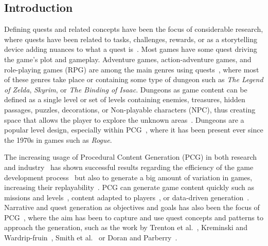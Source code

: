 \subsection{Introduction}

Defining quests and related concepts have been the focus of considerable research, where quests have been related to tasks, challenges, rewards, or as a storytelling device adding nuances to what a quest is~. Most games have some quest driving the game's plot and gameplay. Adventure games, action-adventure games, and role-playing games (RPG) are among the main genres using quests~, where most of these genres take place or containing some type of dungeon such as \emph{The Legend of Zelda}, \emph{Skyrim}, or \emph{The Binding of Isaac}. Dungeons as game content can be defined as a single level or set of levels containing enemies, treasures, hidden passages, puzzles, decorations, or Non-playable characters (NPC), thus creating space that allows the player to explore the unknown areas~. Dungeons are a popular level design, especially within PCG~, where it has been present ever since the 1970s in games such as \emph{Rogue}.

The increasing usage of Procedural Content Generation (PCG) in both research and industry~ has shown successful results regarding the efficiency of the game development process~ but also to generate a big amount of variation in games, increasing their replayability~. PCG can generate game content quickly such as missions and levels~, content adapted to players~, or data-driven generation~. Narrative and quest generation as objectives and goals has also been the focus of PCG~, where the aim has been to capture and use quest concepts and patterns to approach the generation, such as the work by Trenton et al.~, Kreminski and Wardrip-fruin~, Smith et al.~ or Doran and Parberry~. 

